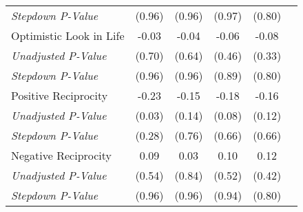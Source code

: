 \begin{tabular}{l c c c c c}
\quad \textit{Stepdown P-Value} & (0.96) & (0.96) & (0.97) & (0.80) \\
Optimistic Look in Life & -0.03 & -0.04 & -0.06 & -0.08 \\
\quad \textit{Unadjusted P-Value} & (0.70) & (0.64) & (0.46) & (0.33) \\
\quad \textit{Stepdown P-Value} & (0.96) & (0.96) & (0.89) & (0.80) \\
Positive Reciprocity & -0.23 & -0.15 & -0.18 & -0.16 \\
\quad \textit{Unadjusted P-Value} & (0.03) & (0.14) & (0.08) & (0.12) \\
\quad \textit{Stepdown P-Value} & (0.28) & (0.76) & (0.66) & (0.66) \\
Negative Reciprocity & 0.09 & 0.03 & 0.10 & 0.12 \\
\quad \textit{Unadjusted P-Value} & (0.54) & (0.84) & (0.52) & (0.42) \\
\quad \textit{Stepdown P-Value} & (0.96) & (0.96) & (0.94) & (0.80) \\
\bottomrule
\end{tabular}
